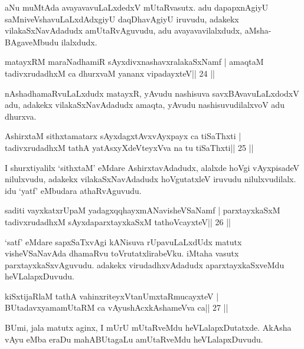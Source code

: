 \begin{artha}
aNu muMtAda avayavavuLaLxdedxV mUtaRvasutx. adu dapapxnAgiyU saMniveVshavuLaLxdAdxgiyU daqDhavAgiyU iruvudu, adakekx vilakaSxNavAdadudx amUtaRvAguvudu, adu avayavavilalxdudx, aMsha-BAgaveMbudu ilalxdudx.
\end{artha}



\begin{shl}
matayxRM maraNadhamiR sAyxdivxnashavxralakaSxNamf |
amaqtaM tadivxrudadhxM ca dhurxvaM yananx vipadayxteV\hfill || 24 ||
\end{shl}

\begin{artha}
nAshadhamaRvuLaLxdudx matayxR, yAvudu nashisuva savxBAvavuLaLxdodxV
adu, adakekx vilakaSxNavAdadudx amaqta, yAvudu nashisuvudilalxvoV adu dhurxva.
\end{artha}

\begin{shl}
AshirxtaM sithxtamatarx sAyxdagxtAvx\s vAyxpayx ca tiSaThxti |
tadivxrudadhxM tathA yatAsxyXdeVteyxVva na tu tiSaThxti\hfill || 25 ||
\end{shl}

\begin{artha}
I shurxtiyalilx `sithxtaM' eMdare AshirxtavAdadudx, alalxde hoVgi
vAyxpisadeV nilulxvudu, adakekx vilakaSxNavAdadudx hoVgutatxleV
iruvudu nilulxvudilalx. idu `yatf' eMbudara athaRvAguvudu.
\end{artha}

\begin{shl}
saditi vayxkatxrUpaM yadagxqqhayxmANavisheVSaNamf |
parxtayxkaSxM tadivxrudadhxM sAyxdaparxtayxkaSxM tathoVcayxteV\hfill || 26 ||
\end{shl}

\begin{artha}
`satf' eMdare sapxSaTxvAgi kANisuva rUpavuLaLxdUdx matutx visheVSaNavAda dhamaRvu toVrutatxlirabeVku. iMtaha vasutx parxtayxkaSxvAguvudu. adakekx virudadhxvAdadudx aparxtayxkaSxveMdu heVLalapxDuvudu.
\end{artha}

\begin{shl}
kiSxtijaRlaM tathA vahinxriteyxVtanUmxtaRmucayxteV |
BUtadavxyamamUtaRM ca vAyushAcx\s\s kAshameVva ca\hfill || 27 ||
\end{shl}

\begin{artha}
BUmi, jala matutx aginx, I mUrU mUtaRveMdu heVLalapxDutatxde. AkAsha vAyu eMba eraDu mahABUtagaLu amUtaRveMdu heVLalapxDuvudu.
\end{artha}

